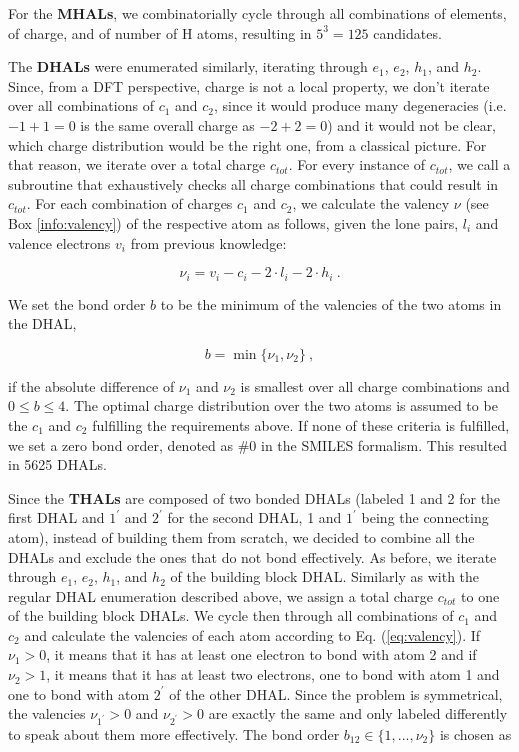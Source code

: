 For the \textbf{MHALs}, we combinatorially cycle through all combinations of elements, of charge, and of number of H atoms, resulting in $5^3=125$ candidates. 

The \textbf{DHALs} were enumerated similarly, iterating through $e_1$, $e_2$, $h_1$, and $h_2$. Since, from a DFT perspective, charge is not a local property, we don't iterate over all combinations of $c_1$ and $c_2$, since it would produce many degeneracies (i.e. $-1+1=0$ is the same overall charge as $-2+2=0$) and it would not be clear, which charge distribution would be the right one, from a classical picture. For that reason, we iterate over a total charge $c_{tot}$. For every instance of $c_{tot}$, we call a subroutine that exhaustively checks all charge combinations that could result in $c_{tot}$. For each combination of charges $c_1$ and $c_2$, we calculate the valency $\nu$ (see Box \ref{info:valency}) of the respective atom as follows, given the lone pairs, $l_i$ and valence electrons $v_i$ from previous knowledge:

\begin{equation}
\label{eq:valency}
\nu_i = v_i - c_i - 2 \cdot l_i - 2 \cdot h_i ~. 
\end{equation}

We set the bond order $b$ to be the minimum of the valencies of the two atoms in the DHAL,

\begin{equation}
b = \min{\{\nu_1,\nu_2\}} ~,
\end{equation}

if the absolute difference of $\nu_1$ and $\nu_2$ is smallest over all charge combinations and $0 \leq b \leq 4$. The optimal charge distribution over the two atoms is assumed to be the $c_1$ and $c_2$ fulfilling the requirements above. If none of these criteria is fulfilled, we set a zero bond order, denoted as $\#0$ in the SMILES formalism. This resulted in 5625 DHALs.

Since the \textbf{THALs} are composed of two bonded DHALs (labeled 1 and 2 for the first DHAL and $1^\prime$ and $2^\prime$ for the second DHAL, 1 and $1^\prime$ being the connecting atom), instead of building them from scratch, we decided to combine all the DHALs and exclude the ones that do not bond effectively. As before, we iterate through $e_1$, $e_2$, $h_1$, and $h_2$ of the building block DHAL. Similarly as with the regular DHAL enumeration described above, we assign a total charge $c_{tot}$ to one of the building block DHALs. We cycle then through all combinations of $c_1$ and $c_2$ and calculate the valencies of each atom according to Eq. (\ref{eq:valency}). If $\nu_1 > 0$, it means that it has at least one electron to bond with atom 2 and if $\nu_2 > 1$, it means that it has at least two electrons, one to bond with atom 1 and one to bond with atom $2^\prime$ of the other DHAL. Since the problem is symmetrical, the valencies $\nu_{1^\prime} > 0$ and $\nu_{2^\prime} > 0$ are exactly the same and only labeled differently to speak about them more effectively. The bond order $b_{12} \in \{1, ..., \nu_2\}$ is chosen as

